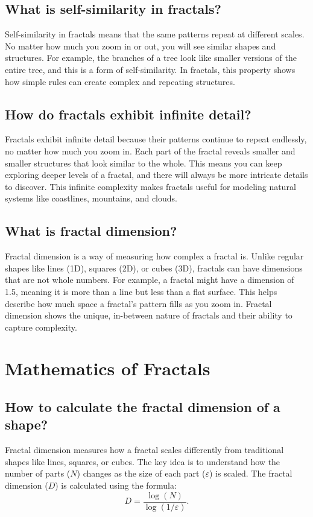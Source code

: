 \documentclass[12pt]{article}
\begin{document}
\subsection{What is self-similarity in fractals?}
Self-similarity in fractals means that the same patterns repeat at different scales. No matter how much you zoom in or out, you will see similar shapes and structures. For example, the branches of a tree look like smaller versions of the entire tree, and this is a form of self-similarity. In fractals, this property shows how simple rules can create complex and repeating structures.

\subsection{How do fractals exhibit infinite detail?}
Fractals exhibit infinite detail because their patterns continue to repeat endlessly, no matter how much you zoom in. Each part of the fractal reveals smaller and smaller structures that look similar to the whole. This means you can keep exploring deeper levels of a fractal, and there will always be more intricate details to discover. This infinite complexity makes fractals useful for modeling natural systems like coastlines, mountains, and clouds.

\subsection{What is fractal dimension?}
Fractal dimension is a way of measuring how complex a fractal is. Unlike regular shapes like lines (1D), squares (2D), or cubes (3D), fractals can have dimensions that are not whole numbers. For example, a fractal might have a dimension of 1.5, meaning it is more than a line but less than a flat surface. This helps describe how much space a fractal's pattern fills as you zoom in. Fractal dimension shows the unique, in-between nature of fractals and their ability to capture complexity.

\section{Mathematics of Fractals}

\subsection{How to calculate the fractal dimension of a shape?}
Fractal dimension measures how a fractal scales differently from traditional shapes like lines, squares, or cubes. The key idea is to understand how the number of parts (\(N\)) changes as the size of each part (\(\varepsilon\)) is scaled. The fractal dimension (\(D\)) is calculated using the formula:
\[
D = \frac{\log(N)}{\log(1/\varepsilon)}.
\]
\end{document}

